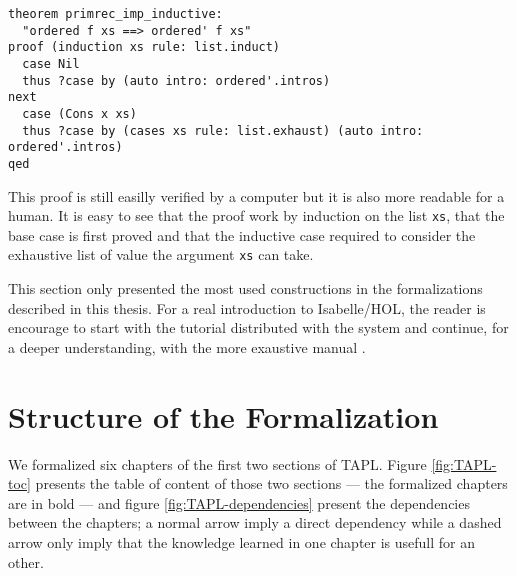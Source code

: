 \documentclass[a4paper, oneside, 12pt, titlepage]{article}
\begin{document}
\begin{verbatim}
theorem primrec_imp_inductive:
  "ordered f xs ==> ordered' f xs"
proof (induction xs rule: list.induct)
  case Nil
  thus ?case by (auto intro: ordered'.intros)
next
  case (Cons x xs)
  thus ?case by (cases xs rule: list.exhaust) (auto intro: ordered'.intros)
qed
\end{verbatim}

This proof is still easilly verified by a computer but it is also more readable for a human. It is
easy to see that the proof work by induction on the list \texttt{xs}, that the base case is first
proved and that the inductive case required to consider the exhaustive list of value the argument
\texttt{xs} can take.

This section only presented the most used constructions in the formalizations described in this
thesis. For a real introduction to Isabelle/HOL, the reader is encourage to start with the tutorial
\cite{???} distributed with the system and continue, for a deeper understanding, with the more
exaustive manual \cite{???}.

\section{Structure of the Formalization}
\label{sec:structure-of-formalization}

We formalized six chapters of the first two sections of TAPL. Figure \ref{fig:TAPL-toc} presents the
table of content of those two sections --- the formalized chapters are in bold --- and figure
\ref{fig:TAPL-dependencies} present the dependencies between the chapters; a normal arrow imply a
direct dependency while a dashed arrow only imply that the knowledge learned in one chapter is
usefull for an other.
\end{document}
